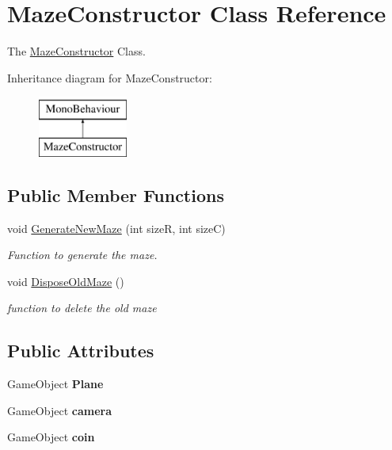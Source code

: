 \hypertarget{class_maze_constructor}{}\section{Maze\+Constructor Class Reference}
\label{class_maze_constructor}


The \mbox{\hyperlink{class_maze_constructor}{Maze\+Constructor}} Class.  


Inheritance diagram for Maze\+Constructor\+:\begin{figure}[H]
\begin{center}
\leavevmode
\includegraphics[height=2.000000cm]{class_maze_constructor}
\end{center}
\end{figure}
\subsection*{Public Member Functions}
\begin{DoxyCompactItemize}
\item 
void \mbox{\hyperlink{class_maze_constructor_aa6ea3f43b97183943c1f8287cfeb4b6f}{Generate\+New\+Maze}} (int sizeR, int sizeC)
\begin{DoxyCompactList}\small\item\em Function to generate the maze. \end{DoxyCompactList}\item 
void \mbox{\hyperlink{class_maze_constructor_abd20925c5331094b43c671c1624e1781}{Dispose\+Old\+Maze}} ()
\begin{DoxyCompactList}\small\item\em function to delete the old maze \end{DoxyCompactList}\end{DoxyCompactItemize}
\subsection*{Public Attributes}
\begin{DoxyCompactItemize}
\item 
\mbox{\label{class_maze_constructor_a4fde78640245a1bdb07b0042071f5948}} 
Game\+Object {\bfseries Plane}
\item 
\mbox{\label{class_maze_constructor_a89ef27f8a232d97536e6a0632080ce55}} 
Game\+Object {\bfseries camera}
\item 
\mbox{\label{class_maze_constructor_a3eff7ebe8dbd6fb9289d1cec4c4bd08f}} 
Game\+Object {\bfseries coin}
\end{DoxyCompactItemize}
